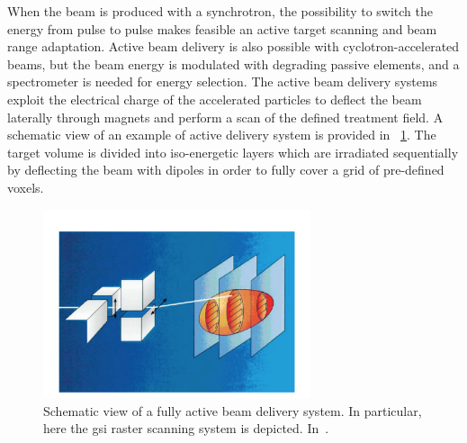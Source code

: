 When the beam is produced with a synchrotron,  the possibility to switch the energy from pulse to pulse makes feasible an active target scanning and beam range adaptation. Active beam delivery is also possible with cyclotron-accelerated beams, but the beam energy is modulated with degrading passive elements, and a spectrometer is needed for energy selection. The active beam delivery systems exploit the electrical charge of the accelerated particles to deflect the beam laterally through magnets and perform a scan of the defined treatment field. A schematic view of an example of active delivery system is provided in \figurename~\ref{chap1::fig::activeDelivery}. The target volume is divided into iso-energetic layers which are irradiated sequentially by deflecting the beam with dipoles in order to fully cover a grid of pre-defined voxels.              

\begin{figure}[!htbp]
\centering
\includegraphics[width=0.7\textwidth]{03_GraphicFiles/chapter1_Introduction/activeDelivery.pdf}
\caption{Schematic view of a fully active beam delivery system. In particular, here the \gls{gsi} raster scanning system is depicted. In~\cite{Schulz-Ertner2006}.}
\label{chap1::fig::activeDelivery}
\end{figure} 

